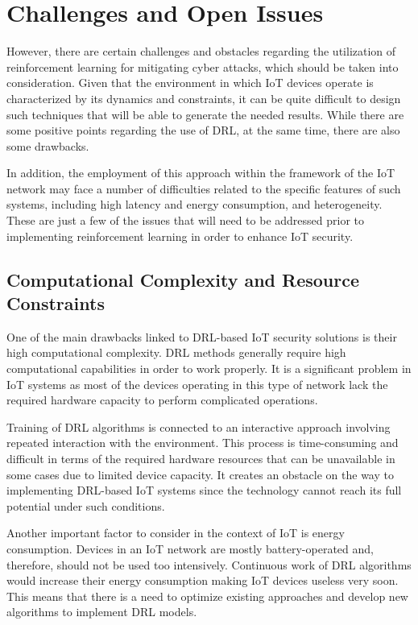 \documentclass[12pt]{article}
\begin{document}
	\section{Challenges and Open Issues}\cite{OrtegaFernandez2023}
	However, there are certain challenges and obstacles regarding the utilization of reinforcement learning for mitigating cyber attacks, which should be taken into consideration. Given that the environment in which IoT devices operate is characterized by its dynamics and constraints, it can be quite difficult to design such techniques that will be able to generate the needed results. While there are some positive points regarding the use of DRL, at the same time, there are also some drawbacks.

In addition, the employment of this approach within the framework of the IoT network may face a number of difficulties related to the specific features of such systems, including high latency and energy consumption, and heterogeneity. These are just a few of the issues that will need to be addressed prior to implementing reinforcement learning in order to enhance IoT security.
\subsection{Computational Complexity and Resource Constraints}
One of the main drawbacks linked to DRL-based IoT security solutions is their high computational complexity. DRL methods generally require high computational capabilities in order to work properly. It is a significant problem in IoT systems as most of the devices operating in this type of network lack the required hardware capacity to perform complicated operations.

Training of DRL algorithms is connected to an interactive approach involving repeated interaction with the environment. This process is time-consuming and difficult in terms of the required hardware resources that can be unavailable in some cases due to limited device capacity. It creates an obstacle on the way to implementing DRL-based IoT systems since the technology cannot reach its full potential under such conditions.

Another important factor to consider in the context of IoT is energy consumption. Devices in an IoT network are mostly battery-operated and, therefore, should not be used too intensively. Continuous work of DRL algorithms would increase their energy consumption making IoT devices useless very soon. This means that there is a need to optimize existing approaches and develop new algorithms to implement DRL models.
\end{document}
